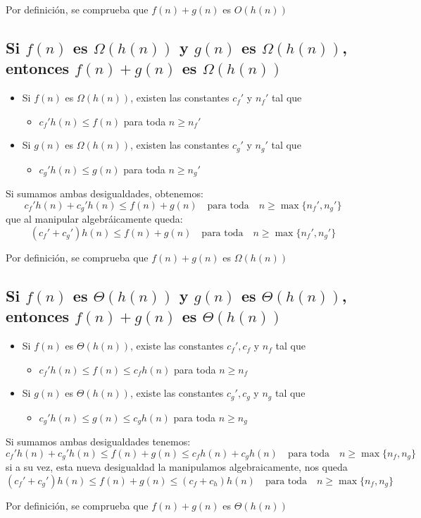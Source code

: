 \documentclass[letterpaper, 12pt]{article}
\begin{document}
\noindent
Por definición, se comprueba que \(f(n) + g(n)\) es \(O(h(n))\)
\subsection{Si \(f(n)\) es \(\Omega(h(n))\) y \(g(n)\) es \(\Omega(h(n))\), entonces \(f(n)+g(n)\) es \(\Omega(h(n))\)}
\label{sec:org4fdfb90}
\begin{itemize}
\item Si \(f(n)\) es \(\Omega(h(n))\), existen las constantes \(c_f'\) y \(n_f'\) tal que
\begin{itemize}
\item \(c_f' h(n) \leq f(n)\) para toda \(n \geq n_f'\)
\end{itemize}
\item Si \(g(n)\) es \(\Omega(h(n))\), existen las constantes \(c_g'\) y \(n_g'\) tal que
\begin{itemize}
\item \(c_g' h(n) \leq g(n)\) para toda \(n \geq n_g'\)
\end{itemize}
\end{itemize}

\noindent
Si sumamos ambas desigualdades, obtenemos:
$$
c_f' h(n) + c_g' h(n) \leq f(n) + g(n) \quad \mbox{para toda} \quad
    n \geq \max\{n_f', n_g'\}
$$
que al manipular algebráicamente queda:
$$
(c_f' + c_g') h(n) \leq f(n) + g(n) \quad \mbox{para toda} \quad
    n \geq \max\{n_f', n_g'\}
$$

\noindent
Por definición, se comprueba que \(f(n) + g(n)\) es \(\Omega(h(n))\)
\subsection{Si \(f(n)\) es \(\Theta(h(n))\) y \(g(n)\) es \(\Theta(h(n))\), entonces \(f(n)+g(n)\) es \(\Theta(h(n))\)}
\label{sec:org0ddcad2}
\begin{itemize}
\item Si \(f(n)\) es \(\Theta(h(n))\), existe las constantes \(c_f', c_f\) y \(n_f\) tal que
\begin{itemize}
\item \(c_f' h(n) \leq f(n) \leq c_f h(n)\) para toda \(n \geq n_f\)
\end{itemize}
\item Si \(g(n)\) es \(\Theta(h(n))\), existe las constantes \(c_g', c_g\) y \(n_g\) tal que
\begin{itemize}
\item \(c_g' h(n) \leq g(n) \leq c_g h(n)\) para toda \(n \geq n_g\)
\end{itemize}
\end{itemize}

\noindent
Si sumamos ambas desigualdades tenemos:
$$
c_f' h(n) + c_g' h(n) \leq f(n) + g(n) \leq c_f h(n) + c_g h(n)
    \quad \mbox{para toda} \quad
    n \geq \max\{n_f, n_g\}
$$
si a su vez, esta nueva desigualdad la manipulamos algebraicamente, nos queda
$$
(c_f' + c_g') h(n) \leq f(n) + g(n) \leq (c_f + c_h) h(n)
    \quad \mbox{para toda} \quad
    n \geq \max\{n_f, n_g\}
$$

\noindent
Por definición, se comprueba que \(f(n) + g(n)\) es \(\Theta(h(n))\)
\end{document}
